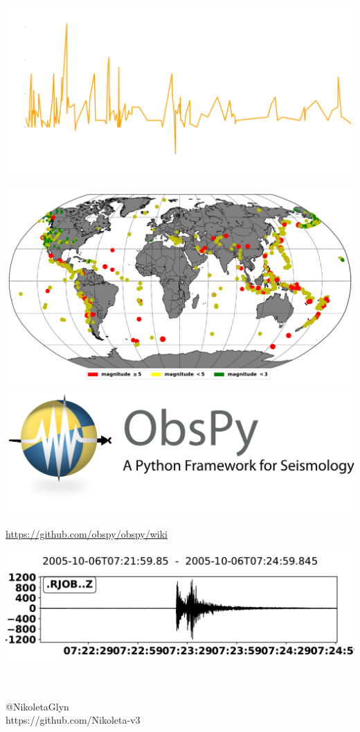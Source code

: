\documentclass{beamer}
\begin{document}
\begin{frame}
    \includegraphics[width=\textwidth]{static/mexico.pdf}
\end{frame}

\begin{frame}
    \includegraphics[width=\textwidth]{static/world_map.pdf}
\end{frame}

\begin{frame}
\centering
    \includegraphics[width=\textwidth]{static/logo.png}
    
    \small{\url{https://github.com/obspy/obspy/wiki}}
\end{frame}

\begin{frame}
    \includegraphics[width=\textwidth]{static/obspy.pdf}
\end{frame}

\begin{frame}
	\begin{center}
		\huge{\textbf{}}\\~\\
		\small{@NikoletaGlyn}\\
		\small{https://github.com/Nikoleta-v3}\\
	\end{center}
\end{frame}
\end{document}
